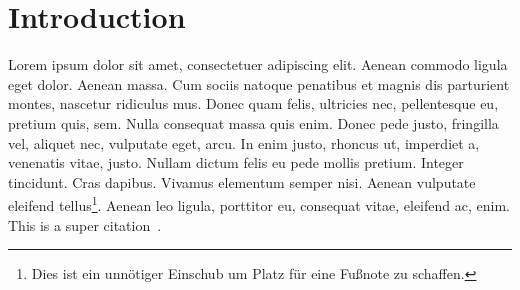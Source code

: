 \chapter{Introduction}
\Blindtext[10]
Lorem ipsum dolor sit amet, consectetuer adipiscing elit. Aenean commodo ligula eget dolor. Aenean massa. Cum sociis natoque penatibus et magnis dis parturient montes, nascetur ridiculus mus. Donec quam felis, ultricies nec, pellentesque eu, pretium quis, sem. Nulla consequat massa quis enim. Donec pede justo, fringilla vel, aliquet nec, vulputate eget, arcu. In enim justo, rhoncus ut, imperdiet a, venenatis vitae, justo. Nullam dictum felis eu pede mollis pretium. Integer tincidunt. Cras dapibus. Vivamus elementum semper nisi. Aenean vulputate eleifend tellus\footnote{Dies ist ein unnötiger Einschub um Platz für eine Fußnote zu schaffen.}. Aenean leo ligula, porttitor eu, consequat vitae, eleifend ac, enim. 
This is a super citation~\cite{book:statrouting}.
